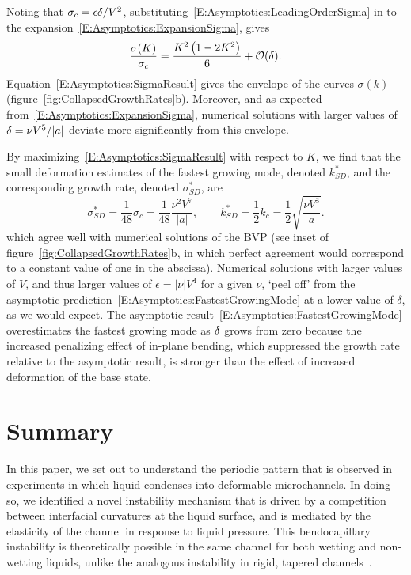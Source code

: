\documentclass{jfm}
\newcommand{\aspect}{a} %
\begin{document}
Noting that $\sigma_c = \epsilon\delta/V^2$, substituting~\eqref{E:Asymptotics:LeadingOrderSigma} in to the expansion~\eqref{E:Asymptotics:ExpansionSigma}, gives
\begin{equation}\label{E:Asymptotics:SigmaResult}
\frac{\sigma(K)}{\sigma_c} =  \frac{K^2\left(1-2K^2 \right)}{6}  + \mathcal{O}(\delta).
\end{equation}
Equation~\eqref{E:Asymptotics:SigmaResult} gives the envelope of the curves $\sigma(k)$ (figure~\ref{fig:CollapsedGrowthRates}b). Moreover, and as expected from~\eqref{E:Asymptotics:ExpansionSigma}, numerical solutions with larger values of $\delta = \nu V^5 /|a|$ deviate more significantly from this envelope.

By maximizing~\eqref{E:Asymptotics:SigmaResult} with respect to $K$, we find that the small deformation estimates of the fastest growing mode, denoted $k^*_{SD}$, and the corresponding growth rate, denoted $\sigma^*_{SD}$, are
\begin{equation}\label{E:Asymptotics:FastestGrowingMode}
\sigma^*_{SD}= \frac{1}{48}\sigma_c = \frac{1}{48}\frac{\nu^2 V^7}{|\aspect|}, \qquad k^*_{SD}= \frac{1}{2}k_c = \frac{1}{2}\sqrt{\frac{\nu V^3}{\aspect}}.
\end{equation}
which agree well with numerical solutions of the BVP (see inset of figure~\ref{fig:CollapsedGrowthRates}b, in which perfect agreement would correspond to a constant value of one in the abscissa). Numerical solutions with larger values of $V$, and thus larger values of $\epsilon = |\nu| V^4$ for a given $\nu$, `peel off' from the asymptotic prediction~\eqref{E:Asymptotics:FastestGrowingMode} at a lower value of $\delta$, as we would expect. The asymptotic result~\eqref{E:Asymptotics:FastestGrowingMode} overestimates the fastest growing mode as $\delta$ grows from zero because the increased penalizing effect of in-plane bending, which suppressed the growth rate relative to the asymptotic result, is stronger than the effect of increased deformation of the base state.

\section{Summary}\label{S:Conclusion}
In this paper, we set out to understand the periodic pattern that is observed in experiments in which liquid condenses into deformable microchannels. In doing so, we identified a novel instability mechanism that is driven by a competition between interfacial curvatures at the liquid surface, and is mediated by the elasticity of the channel in response to liquid pressure. This bendocapillary instability is theoretically possible in the same channel for both wetting and non-wetting liquids, unlike the analogous instability in rigid, tapered channels~\citep{AlHousseiny2012NaturePhysics}.
\end{document}
